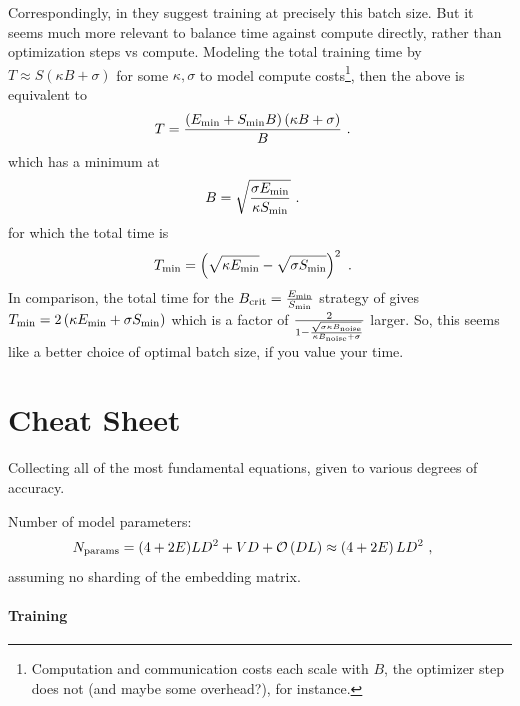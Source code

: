 \documentclass[11pt]{article}
\begin{document}
Correspondingly, in \cite{mccandlish2018empirical} they suggest training at precisely this batch
size.  But it seems much more relevant to balance time against compute directly, rather than
optimization steps vs compute. Modeling the total training time by $ T\approx S \left ( \kappa B + \sigma  \right)$
for some $ \kappa ,\sigma  $ to model compute costs\footnote{Computation and communication costs
	each scale with $ B $, the optimizer step does not (and maybe some overhead?), for instance.}, then
the above is equivalent to
\begin{align}
	T & = \frac{\left ( E _{ {\rm min} } + S _{ {\rm min} } B \right) \left ( \kappa B+ \sigma   \right ) }{  B  }\ .
\end{align}
which has a minimum at
\begin{align}
	B & = \sqrt{\frac{ \sigma E _{ {\rm min} } }{ \kappa S _{ {\rm min} }   }}\ .
\end{align}
for which the total time is
\begin{align}
	T _{ {\rm  min} } & = \left ( \sqrt{\kappa E _{ {\rm  min} }} - \sqrt{\sigma S _{ {\rm min} }} \right ) ^{ 2 }\ .
\end{align}
In comparison, the total time for the $ B _{ {\rm  crit} } = \frac{ E _{ {\rm min} } }{ S _{ {\rm
						min} } } $ strategy of \cite{mccandlish2018empirical} gives $ T _{ {\rm  min} } = 2 \left ( \kappa E
	_{ {\rm min} } + \sigma S _{ {\rm min} } \right ) $ which is a factor of $ \frac{ 2 }{ 1- \frac{
			\sqrt{\sigma \kappa B _{ {\rm noise} } } }{ \kappa B _{ {\rm noise}  } + \sigma } } $ larger.
So, this seems like a better choice of optimal batch size, if you value your time.


\section{Cheat Sheet \label{app_cheat_sheet}}

Collecting all of the most fundamental equations, given to various degrees of accuracy.

Number of model parameters:
\begin{align}
	N _{ {\rm params} } & =   (4+2E)LD ^{ 2 } + VD+ \mathcal{O} \left( DL \right) \approx   \left ( 4+2E \right )LD ^{ 2 }\ ,
\end{align}
assuming no sharding of the embedding matrix.


\paragraph{Training}
\end{document}

